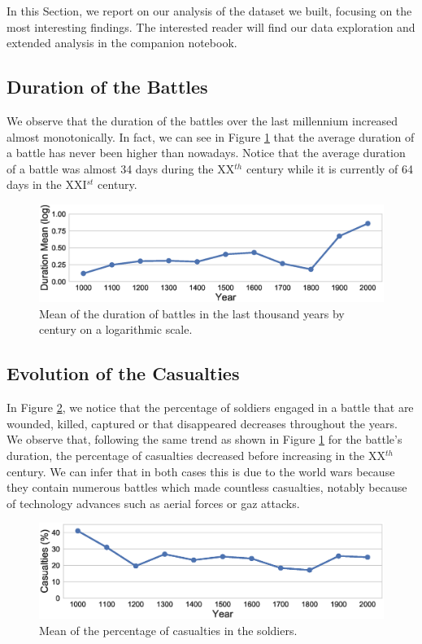 In this Section, we report on our analysis of the dataset we built, focusing on the most interesting findings. The interested reader will find our data exploration and extended analysis in the companion notebook.

\subsection{Duration of the Battles}

We observe that the duration of the battles over the last millennium increased almost monotonically. In fact, we can see in Figure \ref{fig:durThByCent} that the average duration of a battle has never been higher than nowadays. Notice that the average duration of a battle was almost 34 days during the XX$^{th}$ century while it is currently of 64 days in the XXI$^{st}$ century.

 \begin{figure}[h]
	\centering	\includegraphics[width=\linewidth]{figures/durThByCent}
	\caption{Mean of the duration of battles in the last thousand years by century on a logarithmic scale.}\label{fig:durThByCent}
	\centering
\end{figure}

\subsection{Evolution of the Casualties}

In Figure \ref{fig:casuPerCent}, we notice that the percentage of soldiers engaged in a battle that are wounded, killed, captured or that disappeared decreases throughout the years. We observe that, following the same trend as shown in Figure \ref{fig:durThByCent} for the battle's duration, the percentage of casualties decreased before increasing in the XX$^{th}$ century. We can infer that in both cases this is due to the world wars because they contain numerous battles which made countless casualties, notably because of technology advances such as aerial forces or gaz attacks.
 \begin{figure}[h]
	\centering	\includegraphics[width=\linewidth]{figures/casuPerCent}
	\caption{Mean of the percentage of casualties in the soldiers.}\label{fig:casuPerCent}
	\centering
\end{figure}

